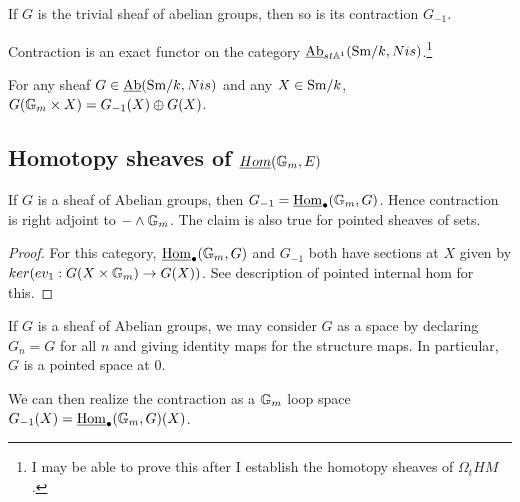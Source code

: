 \documentclass{amsart}%
\begin{document}
\begin{proposition}
  If $G$ is the trivial sheaf of abelian groups, then so is its
  contraction $G_{-1}$.
\end{proposition}

\begin{proposition}
  Contraction is an exact functor on the category
  $\operatorname{\underline{Ab}}_{st\mathbb{A}^1}(\mathrm{Sm}/k,Nis)$.\footnote{I may be able to prove this
    after I establish the homotopy sheaves of $\Omega_t HM$.}

  For any sheaf $G \in \operatorname{\underline{Ab}}(\mathrm{Sm}/k,Nis)$ and any $X \in \mathrm{Sm}/k$,
  $G(\mathbb{G}_m\times X) = G_{-1}(X) \oplus G(X)$.
\end{proposition}


\subsection{Homotopy sheaves of $\underline{Hom}(\mathbb{G}_m, E)$}


\begin{proposition}
  If $G$ is a sheaf of Abelian groups, then
  $G_{-1} = \underline{\operatorname{Hom}}_{\bullet}(\mathbb{G}_m, G)$.  Hence
  contraction is right adjoint to $- \wedge \mathbb{G}_m$. The claim is also
  true for pointed sheaves of sets.
\end{proposition}

\begin{proof}
  For this category, $\underline{\operatorname{Hom}}_{\bullet}(\mathbb{G}_m, G)$ and
  $G_{-1}$ both have sections at $X$ given by
  $ker( ev_1 : G(X \times \mathbb{G}_m) \to G(X))$. See description of
  pointed internal hom for this. 
\end{proof}

\begin{remark}
  If $G$ is a sheaf of Abelian groups, we may consider $G$ as a space
  by declaring $G_n = G$ for all $n$ and giving identity maps for the
  structure maps. In particular, $G$ is a pointed space at $0$. 

  We can then realize the contraction as a $\mathbb{G}_m$ loop space
  $G_{-1}(X) = \underline{\operatorname{Hom}}_{\bullet}(\mathbb{G}_m,G)(X)$.
\end{remark}
\end{document}
